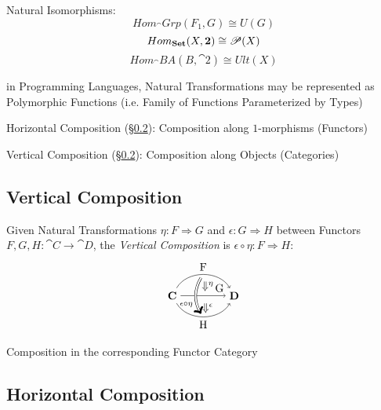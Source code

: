 Natural Isomorphisms:
\[
  Hom_\cat{Grp}(F_1,G) \cong U(G)
\]\[
  Hom_\mathbf{Set}(X,\mathbf{2}) \cong \mathscr{P}(X)
\]\[
  Hom_\cat{BA}(B,\cat{2}) \cong Ult(X)
\]

in Programming Languages, Natural Transformations may be represented
as Polymorphic Functions (i.e. Family of Functions Parameterized by
Types)

Horizontal Composition (\S\ref{sec:horizontal_composition}):
Composition along $1$-morphisms (Functors)

Vertical Composition (\S\ref{sec:horizontal_composition}):
Composition along Objects (Categories)



\subsection{Vertical Composition}\label{sec:vertical_composition}

Given Natural Transformations $\eta : F \Rightarrow G$ and $\epsilon :
G \Rightarrow H$ between Functors $F,G,H : \cat{C} \rightarrow
\cat{D}$, the \emph{Vertical Composition} is $\epsilon\circ\eta : F
\Rightarrow H$:
\[
  \begin{tikzpicture}
    \node (C) at (-1,0) {$\cat{C}$};
    \node (D) at (1,0) {$\cat{D}$};
    \node (N) at (0,0.3) {$\;\;\;\Downarrow^\eta$};
    \node (M) at (0,-0.4) {$\;\;\;\Downarrow^\epsilon$};
    \node (F) at (0,0.7) {};
    \node (H) at (0,-0.7) {};
    \draw[->,bend left=60] (C) to node [above] {F} (D);
    \draw[->] (C) to node [above] {\quad\quad\quad G} (D);
    \draw[->,bend right=60] (C) to node [below] {H} (D);
    \draw[->,bend right=30,double distance=1.5pt] (F) to
      node [left,pos=0.75] {$_{\epsilon\circ\eta}$} (H);
  \end{tikzpicture}
\]

Composition in the corresponding Functor Category



\subsection{Horizontal Composition}\label{sec:horizontal_composition}

